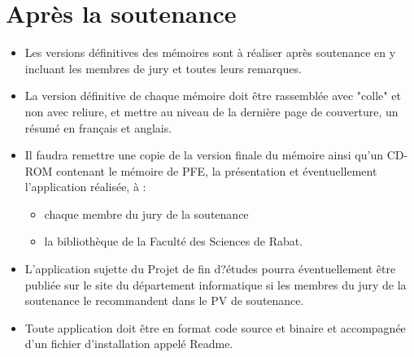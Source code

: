 \section{Après la soutenance}
 \begin{itemize}
 	\item Les versions définitives des mémoires sont à réaliser après soutenance en y incluant les membres de jury et toutes leurs remarques. \\
 	
 	\item La version  définitive de chaque mémoire  doit être rassemblée avec "colle" et non avec reliure, et mettre au niveau de la dernière page de couverture, un résumé en français et anglais.\\
 	 		
 	\item Il faudra remettre une copie de la version finale du mémoire ainsi qu'un CD-ROM contenant le mémoire de PFE, la présentation et éventuellement l'application réalisée, à :\\
 	\begin{itemize}
 		\item chaque membre du jury de la soutenance 
 		\item la bibliothèque de la Faculté des Sciences de Rabat.
  	\end{itemize}
  	
  	\item L'application sujette du Projet de fin d?études pourra éventuellement être publiée sur le site du département informatique si les membres du jury de la soutenance le recommandent dans le PV de soutenance.\\
  	
  	\item Toute application doit être en format code source et binaire et accompagnée d'un fichier d'installation appelé Readme.\\
  \end{itemize}
 	
